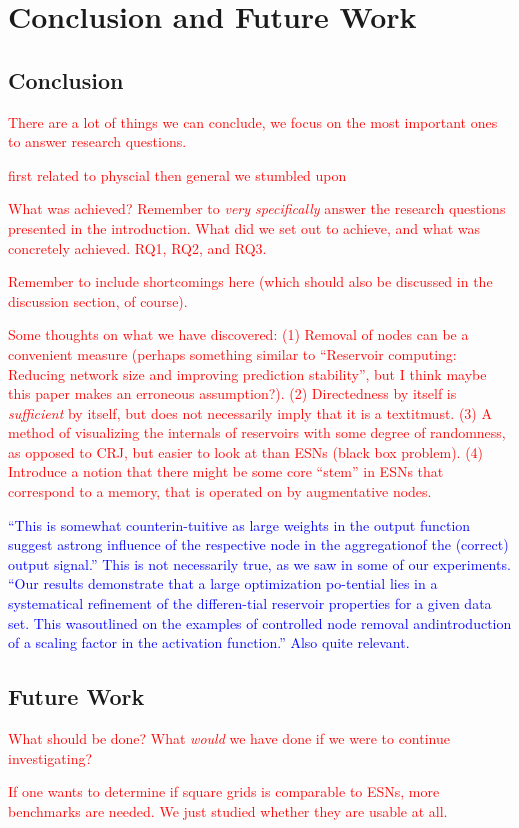 \chapter{Conclusion and Future Work}
\label{ch:conclusion}

\section{Conclusion}

\textcolor{red}{
  There are a lot of things we can conclude, we focus on the most important ones
to answer research questions.
}

\textcolor{red}{
  first related to physcial then general we stumbled upon
}

\textcolor{red}{
  What was achieved? Remember to \textit{very specifically} answer the research
questions presented in the introduction. What did we set out to achieve, and
what was concretely achieved. RQ1, RQ2, and RQ3.
}

\textcolor{red}{
  Remember to include shortcomings here (which should also be discussed in the
discussion section, of course).
}

\textcolor{red}{
  Some thoughts on what we have discovered: (1) Removal of nodes can be a
convenient measure (perhaps something similar to ``Reservoir computing: Reducing
network size and improving prediction stability'', but I think maybe this paper
makes an erroneous assumption?). (2) Directedness by itself is
\textit{sufficient} by itself, but does not necessarily imply that it is a
textit{must}. (3) A method of visualizing the internals of reservoirs with some
degree of randomness, as opposed to CRJ, but easier to look at than ESNs (black
box problem). (4) Introduce a notion that there might be some core ``stem'' in
ESNs that correspond to a memory, that is operated on by augmentative nodes.
}

\textcolor{blue}{
  ``This is somewhat counterin-tuitive as large weights in the output function
suggest astrong influence of the respective node in the aggregationof the
(correct) output signal.'' This is not necessarily true, as we saw in some of
our experiments. ``Our results demonstrate that a large optimization po-tential
lies in a systematical refinement of the differen-tial reservoir properties for
a given data set.  This wasoutlined on the examples of controlled node removal
andintroduction of a scaling factor in the activation function.'' Also quite
relevant.
}

\section{Future Work}

\textcolor{red}{
  What should be done? What \textit{would} we have done if we were to continue
investigating?
}

\textcolor{red}{
  If one wants to determine if square grids is comparable to ESNs, more
benchmarks are needed. We just studied whether they are usable at all.
}

